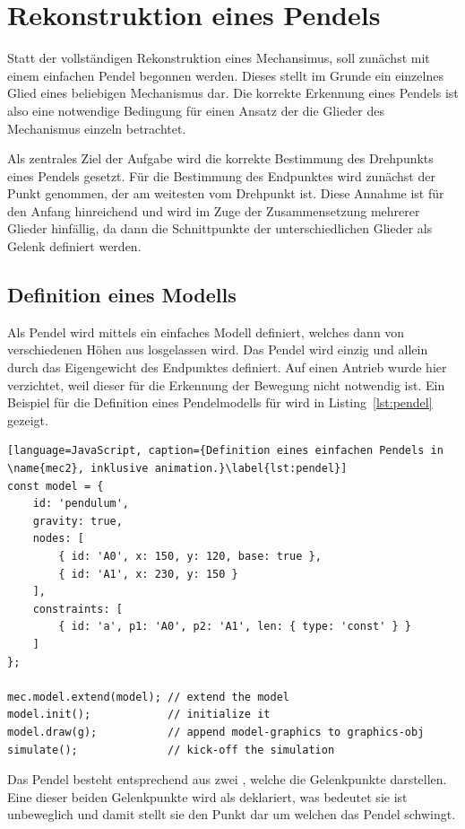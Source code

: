 \chapter{Rekonstruktion eines Pendels}

Statt der vollständigen Rekonstruktion eines Mechansimus, soll zunächst mit einem einfachen Pendel begonnen werden.
Dieses stellt im Grunde ein einzelnes Glied eines beliebigen Mechanismus dar. Die korrekte Erkennung eines Pendels ist also eine notwendige Bedingung für einen Ansatz der die Glieder des Mechanismus einzeln betrachtet.

Als zentrales Ziel der Aufgabe wird die korrekte Bestimmung des Drehpunkts eines Pendels gesetzt.
Für die Bestimmung des Endpunktes wird zunächst der Punkt genommen, der am weitesten vom Drehpunkt ist.
Diese Annahme ist für den Anfang hinreichend und wird im Zuge der Zusammensetzung mehrerer Glieder hinfällig, da dann die Schnittpunkte der unterschiedlichen Glieder als Gelenk definiert werden.

\section{Definition eines  Modells}

Als Pendel wird mittels  ein einfaches Modell definiert, welches dann von verschiedenen Höhen aus losgelassen wird.
Das Pendel wird einzig und allein durch das Eigengewicht des Endpunktes definiert.
Auf einen Antrieb wurde hier verzichtet, weil dieser für die Erkennung der Bewegung nicht notwendig ist.
Ein Beispiel für die Definition eines Pendelmodells für  wird in Listing~\ref{lst:pendel} gezeigt.

\begin{lstlisting}[language=JavaScript, caption={Definition eines einfachen Pendels in \name{mec2}, inklusive animation.}\label{lst:pendel}]
const model = {
    id: 'pendulum',
    gravity: true,
    nodes: [
        { id: 'A0', x: 150, y: 120, base: true },
        { id: 'A1', x: 230, y: 150 }
    ],
    constraints: [
        { id: 'a', p1: 'A0', p2: 'A1', len: { type: 'const' } }
    ]
};

mec.model.extend(model); // extend the model
model.init();            // initialize it
model.draw(g);           // append model-graphics to graphics-obj
simulate();              // kick-off the simulation
\end{lstlisting}

Das Pendel besteht entsprechend aus zwei , welche die Gelenkpunkte darstellen.
Eine dieser beiden Gelenkpunkte wird als  deklariert, was bedeutet sie ist unbeweglich und damit stellt sie den Punkt dar um welchen das Pendel schwingt.

